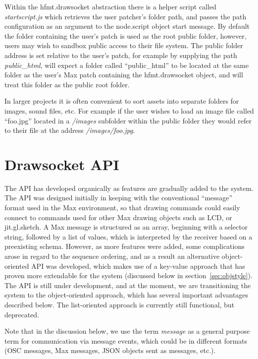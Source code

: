 Within the hfmt.drawsocket abstraction there is a helper script called \textit{startscript.js} which retrieves the user patcher's folder path, and passes the path configuration as an argument to the node.script object start message. 
By default the folder containing the user's patch is used as the root public folder, however, users may wish to sandbox public access to their file system.
The public folder address is set relative to the user's patch, for example by supplying the path \textit{public\_html}, \drawsocket will expect a folder called ``public\_html'' to be located at the same folder as the user's Max patch containing the hfmt.drawsocket object, and will treat this folder as the public root folder.

In larger projects it is often convenient to sort assets into separate folders for images, sound files, etc. For example if the user wishes to load an image file called ``foo.jpg'' located in a \textit{/images} subfolder within the public folder they would refer to their file at the address \textit{/images/foo.jpg}.

\section{Drawsocket API}\label{sec:api}
The \drawsocket API has developed organically as features are gradually added to the system.
The API was designed initially in keeping with the conventional ``message'' format used in the Max environment, so that drawing commands could easily connect to commands used for other Max drawing objects such as LCD, or jit.gl.sketch.
A Max message is structured as an array, beginning with a selector string, followed by a list of values, which is interpreted by the receiver based on a preexisting schema.
However, as more features were added, some complications arose in regard to the sequence ordering, and as a result an alternative object-oriented API was developed, which makes use of a key-value approach that has proven more extendable for the \drawsocket system (discussed below in section~\ref{sec:objstyle}).
The API is still under development, and at the moment, we are transitioning the system to the object-oriented approach, which has several important advantages described below. 
The list-oriented approach is currently still functional, but deprecated.

Note that in the discussion below, we use the term \textit{message} as a general purpose term for communication via message events, which could be in different formats (OSC messages, Max messages, JSON objects sent as messages, etc.).

